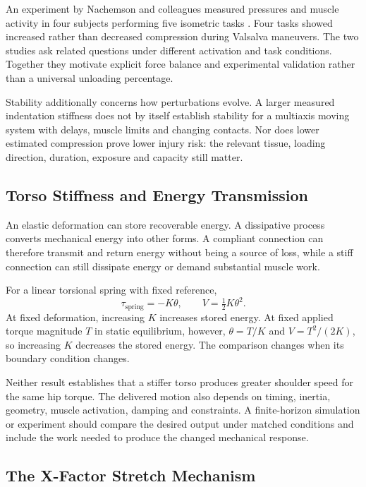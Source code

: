 An experiment by Nachemson and colleagues measured pressures and muscle activity in four subjects performing five isometric tasks \citep{Nachemson1986Valsalva}. Four tasks showed increased rather than decreased compression during Valsalva maneuvers. The two studies ask related questions under different activation and task conditions. Together they motivate explicit force balance and experimental validation rather than a universal unloading percentage.

Stability additionally concerns how perturbations evolve. A larger measured indentation stiffness does not by itself establish stability for a multiaxis moving system with delays, muscle limits and changing contacts. Nor does lower estimated compression prove lower injury risk: the relevant tissue, loading direction, duration, exposure and capacity still matter.

\subsection{Torso Stiffness and Energy Transmission}

An elastic deformation can store recoverable energy. A dissipative process converts mechanical energy into other forms. A compliant connection can therefore transmit and return energy without being a source of loss, while a stiff connection can still dissipate energy or demand substantial muscle work.

For a linear torsional spring with fixed reference,
\[
\tau_{\mathrm{spring}}=-K\theta,\qquad
V=\tfrac12K\theta^2.
\]
At fixed deformation, increasing $K$ increases stored energy. At fixed applied torque magnitude $T$ in static equilibrium, however, $\theta=T/K$ and $V=T^2/(2K)$, so increasing $K$ decreases the stored energy. The comparison changes when its boundary condition changes.

Neither result establishes that a stiffer torso produces greater shoulder speed for the same hip torque. The delivered motion also depends on timing, inertia, geometry, muscle activation, damping and constraints. A finite-horizon simulation or experiment should compare the desired output under matched conditions and include the work needed to produce the changed mechanical response.

\subsection{The X-Factor Stretch Mechanism}

